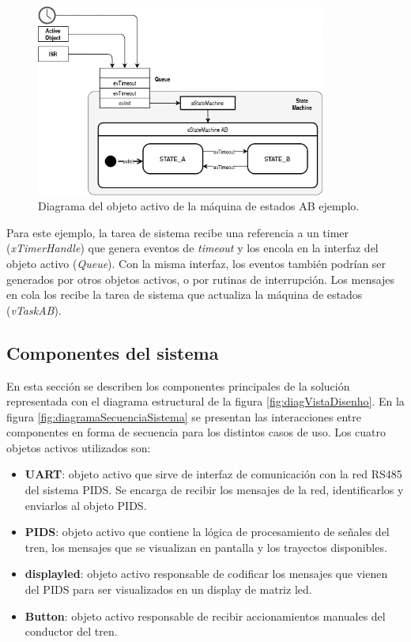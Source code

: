 \begin{figure}[ht]
	\centering
	\includegraphics[width=0.85\textwidth]{./Figures/AOstatemachineAB.png}
	\caption{Diagrama del objeto activo de la máquina de estados AB ejemplo.}
	\label{fig:AOfsmAB}
\end{figure}

Para este ejemplo, la tarea de sistema recibe una referencia a un timer (\textit{xTimerHandle}) que genera eventos de \textit{timeout} y los encola en la interfaz del objeto activo (\textit{Queue}). Con la misma interfaz, los eventos también podrían ser generados por otros objetos activos, o por rutinas de interrupción. Los mensajes en cola los recibe  la tarea de sistema que actualiza la máquina de estados (\textit{vTaskAB}).\\

\subsection{Componentes del sistema}

En esta sección se describen los componentes principales de la solución representada con el diagrama estructural de la figura \ref{fig:diagVistaDisenho}. En la figura \ref{fig:diagramaSecuenciaSistema} se presentan las interacciones entre componentes en forma de secuencia para los distintos casos de uso. Los cuatro objetos activos utilizados son:\\
\begin{itemize}
\item \textbf{UART}: objeto activo que sirve de interfaz de comunicación con la red RS485 del sistema PIDS. Se encarga de recibir los mensajes de la red, identificarlos y enviarlos al objeto PIDS.
\item \textbf{PIDS}: objeto activo que contiene la lógica de procesamiento de señales del tren, los mensajes que se visualizan en pantalla y los trayectos disponibles. 
\item \textbf{displayled}: objeto activo responsable de codificar los mensajes que vienen del PIDS para ser visualizados en un display de matriz led.
\item \textbf{Button}: objeto activo responsable de recibir accionamientos manuales del conductor del tren.
\end{itemize}

